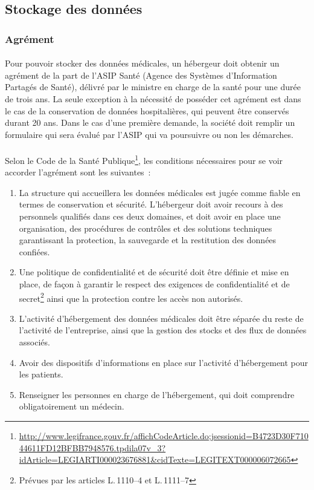         \subsection{Stockage des données}
        \subsubsection{Agrément}

\paragraph{}
Pour pouvoir stocker des données médicales, un hébergeur doit obtenir un
agrément de la part de l'ASIP Santé (Agence des Systèmes d'Information Partagés
de Santé), délivré par le ministre en charge de la santé pour une durée de
trois ans. La seule exception à la nécessité de posséder cet agrément est dans
le cas de la conservation de données hospitalières, qui peuvent être conservés
durant 20 ans. Dans le cas d'une première demande, la société doit remplir un
formulaire qui sera évalué par l'ASIP qui va poursuivre ou non les démarches.

\paragraph{}
Selon le Code de la Santé
Publique\footnote{\url{http://www.legifrance.gouv.fr/affichCodeArticle.do;jsessionid=B4723D30F71044611FD12BFBB7948576.tpdila07v_3?idArticle=LEGIARTI000023676881&cidTexte=LEGITEXT000006072665}},
les conditions nécessaires pour se voir accorder l'agrément sont les
suivantes~:
\begin{enumerate}
    \item La structure qui accueillera les données médicales est jugée comme
        fiable en termes de conservation et sécurité. L'hébergeur doit avoir
        recours à des personnels qualifiés dans ces deux domaines, et doit
        avoir en place une organisation, des procédures de contrôles et des
        solutions techniques garantissant la protection, la sauvegarde et la
        restitution des données confiées.
    \item Une politique de confidentialité et de sécurité doit être définie et
        mise en place, de façon à garantir le respect des exigences de
        confidentialité et de secret\footnote{Prévues par les articles
        L.\,1110--4 et L.\,1111--7} ainsi que la protection contre les accès
        non autorisés.
    \item L'activité d'hébergement des données médicales doit être séparée du
        reste de l'activité de l'entreprise, ainsi que la gestion des stocks et
        des flux de données associés.
    \item Avoir des dispositifs d'informations en place sur l'activité
        d'hébergement pour les patients.
    \item Renseigner les personnes en charge de l'hébergement, qui doit
        comprendre obligatoirement un médecin.
\end{enumerate}

